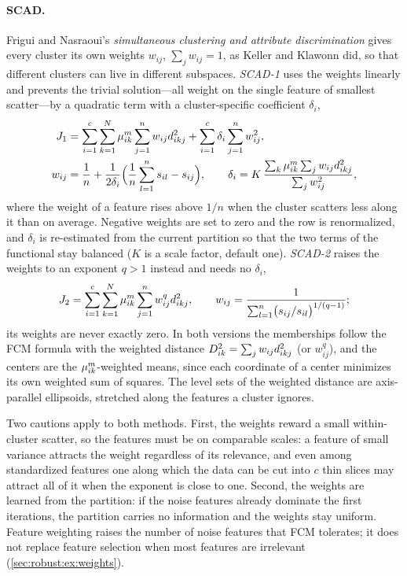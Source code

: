 \paragraph{SCAD.} Frigui and Nasraoui's \emph{simultaneous clustering and attribute discrimination} \cite{frigui:2004:scad} gives every cluster its own weights $w_{ij}$, $\sum_jw_{ij}=1$, as Keller and Klawonn did, so that different clusters can live in different subspaces. \emph{SCAD-1} uses the weights linearly and prevents the trivial solution---all weight on the single feature of smallest scatter---by a quadratic term with a cluster-specific coefficient $\delta_i$,
\begin{align}
  J_1&=\sum_{i=1}^{c}\sum_{k=1}^{N}\mu_{ik}^m\sum_{j=1}^{n}w_{ij}d^2_{ikj}+\sum_{i=1}^{c}\delta_i\sum_{j=1}^{n}w_{ij}^2,\notag\\
  w_{ij}&=\frac1n+\frac{1}{2\delta_i}\Bigl(\frac1n\sum_{l=1}^{n}s_{il}-s_{ij}\Bigr),\qquad
  \delta_i=K\,\frac{\sum_k\mu_{ik}^m\sum_jw_{ij}d^2_{ikj}}{\sum_jw_{ij}^2},
  \label{eq:robust:scad1}
\end{align}
where the weight of a feature rises above $1/n$ when the cluster scatters less along it than on average. Negative weights are set to zero and the row is renormalized, and $\delta_i$ is re-estimated from the current partition so that the two terms of the functional stay balanced ($K$ is a scale factor, default one). \emph{SCAD-2} raises the weights to an exponent $q>1$ instead and needs no $\delta_i$,
\begin{equation}
  J_2=\sum_{i=1}^{c}\sum_{k=1}^{N}\mu_{ik}^m\sum_{j=1}^{n}w_{ij}^q d^2_{ikj},\qquad
  w_{ij}=\frac{1}{\sum_{l=1}^{n}\bigl(s_{ij}/s_{il}\bigr)^{1/(q-1)}};
  \label{eq:robust:scad2}
\end{equation}
its weights are never exactly zero. In both versions the memberships follow the FCM formula with the weighted distance $D^2_{ik}=\sum_jw_{ij}d^2_{ikj}$ (or $w_{ij}^q$), and the centers are the $\mu_{ik}^m$-weighted means, since each coordinate of a center minimizes its own weighted sum of squares. The level sets of the weighted distance are axis-parallel ellipsoids, stretched along the features a cluster ignores.

Two cautions apply to both methods. First, the weights reward a small within-cluster scatter, so the features must be on comparable scales: a feature of small variance attracts the weight regardless of its relevance, and even among standardized features one along which the data can be cut into $c$ thin slices may attract all of it when the exponent is close to one. Second, the weights are learned from the partition: if the noise features already dominate the first iterations, the partition carries no information and the weights stay uniform. Feature weighting raises the number of noise features that FCM tolerates; it does not replace feature selection when most features are irrelevant (\cref{sec:robust:ex:weights}).

